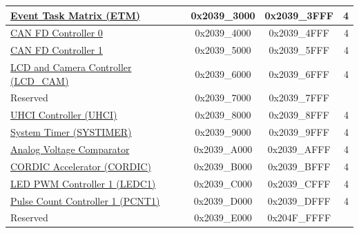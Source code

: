 \begin{ThreePartTable}
\begin{longtable}[c]{ |p{7cm}|c|c|r| }
    \hyperref[mod:evntaskmatrix]{Event Task Matrix (ETM)} & 0x2039\_3000 & 0x2039\_3FFF &   4\\\hline
    \hyperref[mod:twai]{CAN FD Controller 0} & 0x2039\_4000 & 0x2039\_4FFF &   4\\\hline
    \hyperref[mod:twai]{CAN FD Controller 1} & 0x2039\_5000 & 0x2039\_5FFF &   4\\\hline
    \hyperref[mod:camlcdctrl]{LCD and Camera Controller (LCD\_CAM)} & 0x2039\_6000 & 0x2039\_6FFF &   4\\\hline
        \rowcolor{gray!25}  Reserved        & 0x2039\_7000 & 0x2039\_7FFF &    \\\hline
    \hyperref[mod:uart]{UHCI Controller (UHCI)}          & 0x2039\_8000 & 0x2039\_8FFF &   4\\\hline
    \hyperref[mod:systimer]{System Timer (SYSTIMER)} & 0x2039\_9000 & 0x2039\_9FFF &   4\\\hline
    \hyperref[mod:anacom]{Analog Voltage Comparator} & 0x2039\_A000 & 0x2039\_AFFF &   4\\\hline
    \hyperref[mod:cordic]{CORDIC Accelerator (CORDIC)} & 0x2039\_B000 & 0x2039\_BFFF &   4\\\hline
    \hyperref[mod:ledpwm]{LED PWM Controller 1 (LEDC1)} & 0x2039\_C000 & 0x2039\_CFFF &   4\\\hline
    \hyperref[mod:pcnt]{Pulse Count Controller 1 (PCNT1)} & 0x2039\_D000 & 0x2039\_DFFF &   4\\\hline
        \rowcolor{gray!25}  Reserved        & 0x2039\_E000 & 0x204F\_FFFF &    \\\hline


\end{longtable}
\end{ThreePartTable}
